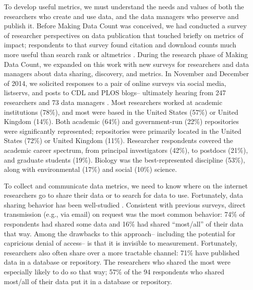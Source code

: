 \documentclass[english]{article}
\begin{document}

To develop useful metrics, we must understand the needs and values of both the researchers who create and use data, and the data managers who preserve and publish it.
Before Making Data Count was conceived, we had conducted a survey of researcher perspectives on data publication that touched briefly on metrics of impact; respondents to that survey found citation and download counts much more useful than search rank or altmetrics \cite{kratz_researcher_2015}.
During the research phase of Making Data Count, we expanded on this work with new surveys for researchers and data managers about data sharing, discovery, and metrics.
In November and December of 2014, we solicited responses to a pair of online surveys via social media, listservs, and posts to CDL and PLOS blogs-- ultimately hearing from 247 researchers and 73 data managers \cite{kratz_making_2015}.
Most researchers worked at academic institutions (78\%), and most were based in the United States (57\%) or United Kingdom (14\%).
Both academic (64\%) and government-run (22\%) repositories were significantly represented; repositories were primarily located in the United States (72\%) or United Kingdom (11\%).
Researcher respondents covered the academic career spectrum, from principal investigators (42\%), to postdocs (21\%), and graduate students (19\%). 
Biology was the best-represented discipline (53\%), along with environmental (17\%) and social (10\%) science. 



To collect and communicate data metrics, we need to know where on the internet researchers go to share their data or to search for data to use. 
Fortunately, data sharing behavior has been well-studied \cite{tenopir_data_2011, akers_disciplinary_2013, wallis_if_2013, aydinoglu_data_2014, kratz_researcher_2015}. 
Consistent with previous surveys, direct transmission (e.g., via email) on request was the most common behavior: 74\% of respondents had shared some data and 16\% had shared ``most/all'' of their data that way.
Among the drawbacks to this approach-- including the potential for capricious denial of access-- is that it is invisible to measurement. 
Fortunately, researchers also often share over a more tractable channel: 71\% have published data in a database or repository.
The researchers who shared the most were especially likely to do so that way; 57\% of the 94 respondents who shared most/all of their data put it in a database or repository.
\end{document}
